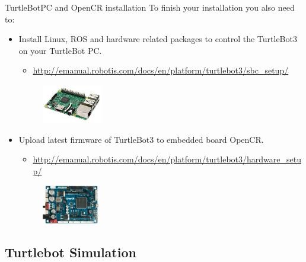 \begin{frame}{TurtleBotPC and OpenCR installation}
To finish your installation you also need to:
\begin{itemize}
 \item Install Linux, ROS and hardware related packages to control the TurtleBot3 on your TurtleBot PC.
  \begin{itemize}
   \item \url{http://emanual.robotis.com/docs/en/platform/turtlebot3/sbc_setup/}
  \end{itemize}
  \begin{figure}
   \includegraphics[height=1.7cm]{./img/ros/raspberry.jpg}
  \end{figure}
 \item Upload latest firmware of TurtleBot3 to embedded board OpenCR.
  \begin{itemize}
   \item \url{http://emanual.robotis.com/docs/en/platform/turtlebot3/hardware_setup/}
  \end{itemize}
  \begin{figure}
   \includegraphics[height=1.7cm]{./img/ros/opencr.png}
  \end{figure}
\end{itemize}
\end{frame}

\subsection{Turtlebot Simulation}

